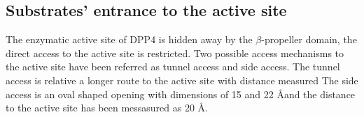 \subsection{Substrates' entrance to the active site}

The enzymatic active site of DPP4 is hidden away by the $\beta$-propeller domain, the direct access to the active site is restricted. Two possible access mechanisms to the active site have been referred as tunnel access and side access. The tunnel access is relative a longer route to the active site with distance measured The side access is an oval shaped opening with dimensions of 15 and 22 \AA and the distance to the active site has been messasured as 20 \AA.~\cite{Engel_2003}